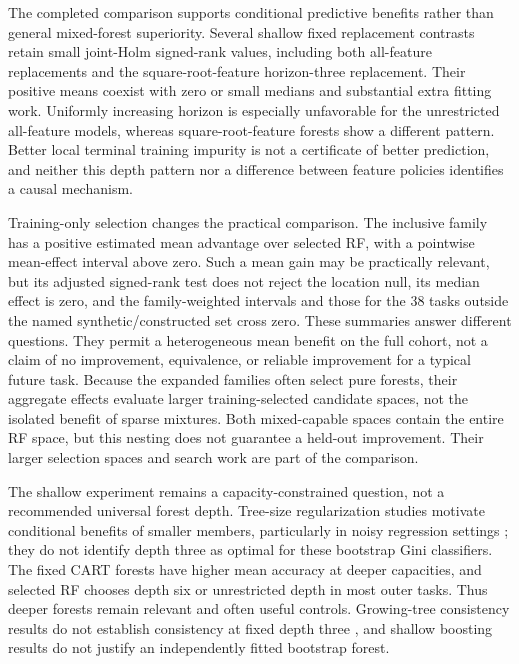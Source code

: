 
The completed comparison supports conditional predictive benefits rather
than general mixed-forest superiority. Several shallow fixed replacement
contrasts retain small joint-Holm signed-rank values, including both
all-feature replacements and the square-root-feature horizon-three
replacement. Their positive means coexist with zero or small medians
and substantial extra fitting work. Uniformly increasing horizon is
especially unfavorable for the unrestricted all-feature models, whereas
square-root-feature forests show a different pattern. Better local
terminal training impurity is not a certificate of better prediction,
and neither this depth pattern nor a difference between feature policies
identifies a causal mechanism.

Training-only selection changes the practical comparison. The inclusive
family has a positive estimated mean advantage over selected RF, with a
pointwise mean-effect interval above zero. Such a mean gain may be practically
relevant, but its adjusted signed-rank test
does not reject the location null, its median effect is zero, and the
family-weighted intervals and those for the 38 tasks outside the named
synthetic/constructed set cross zero. These summaries answer different questions. They permit a heterogeneous mean
benefit on the full cohort, not a claim of no improvement, equivalence,
or reliable improvement for a typical future task. Because the expanded
families often select pure forests, their aggregate effects evaluate
larger training-selected candidate spaces, not the isolated benefit of
sparse mixtures. Both mixed-capable spaces contain the entire RF space,
but this nesting does not guarantee a held-out improvement. Their larger
selection spaces and search work are part of the comparison.

The shallow experiment remains a capacity-constrained question, not a
recommended universal forest depth. Tree-size regularization studies
motivate conditional benefits of smaller members, particularly in noisy
regression settings \cite{zhou2023trees,duroux2018impact}; they do not
identify depth three as optimal for these bootstrap Gini classifiers.
The fixed CART forests have higher mean accuracy at deeper capacities,
and selected RF chooses depth six or unrestricted depth in most outer
tasks. Thus deeper forests remain relevant and often useful controls.
Growing-tree consistency results do not establish consistency at fixed
depth three \cite{scornet2015consistency}, and shallow boosting results
do not justify an independently fitted bootstrap forest.

